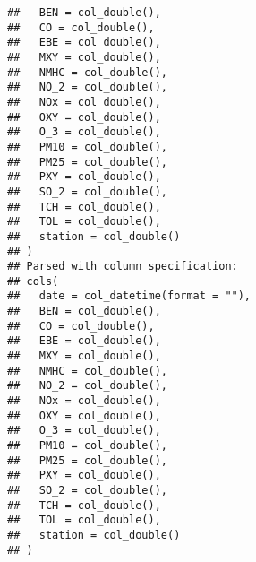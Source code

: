 \documentclass[
]{article}
\begin{document}
\begin{verbatim}
##   BEN = col_double(),
##   CO = col_double(),
##   EBE = col_double(),
##   MXY = col_double(),
##   NMHC = col_double(),
##   NO_2 = col_double(),
##   NOx = col_double(),
##   OXY = col_double(),
##   O_3 = col_double(),
##   PM10 = col_double(),
##   PM25 = col_double(),
##   PXY = col_double(),
##   SO_2 = col_double(),
##   TCH = col_double(),
##   TOL = col_double(),
##   station = col_double()
## )
## Parsed with column specification:
## cols(
##   date = col_datetime(format = ""),
##   BEN = col_double(),
##   CO = col_double(),
##   EBE = col_double(),
##   MXY = col_double(),
##   NMHC = col_double(),
##   NO_2 = col_double(),
##   NOx = col_double(),
##   OXY = col_double(),
##   O_3 = col_double(),
##   PM10 = col_double(),
##   PM25 = col_double(),
##   PXY = col_double(),
##   SO_2 = col_double(),
##   TCH = col_double(),
##   TOL = col_double(),
##   station = col_double()
## )
\end{verbatim}
\end{document}
